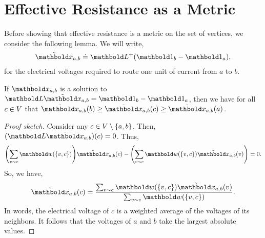 \section{Effective Resistance as a Metric}

Before showing that effective resistance is a metric on the set of vertices, we consider the following lemma. We will write, \begin{align}
    \elx_{a,b} \defeq \pinv{\mL}(\vOne_b - \vOne_a),
\end{align} for the electrical voltages required to route one unit of current from $a$ to $b$.

\begin{lem}\label{lem:voltages_are_weighted_average}
If $\elx_{a,b}$ is a solution to $\mL\elx_{a,b} = \vOne_b - \vOne_a$, then we have for all $c \in V$ that $\elx_{a,b}(b) \geq \elx_{a,b}(c) \geq \elx_{a,b}(a)$.
\end{lem}
\begin{proof}[Proof sketch] Consider any $c \in V \setminus \{a,b\}$. Then, $(\mL\elx_{a,b})(c) = 0$. Thus, \begin{align*}
    \parentheses*{\sum_{v \sim c} \vw(\{v,c\})} \elx_{a,b}(c) - \parentheses*{\sum_{v \sim c} \vw(\{v,c\}) \elx_{a,b}(v)} = 0.
\end{align*} So, we have, \begin{align*}
    \elx_{a,b}(c) = \frac{\sum_{v \sim c} \vw(\{v,c\}) \elx_{a,b}(v)}{\sum_{v \sim c} \vw(\{v,c\})}.
\end{align*} In words, the electrical voltage of $c$ is a weighted average of the voltages of its neighbors. It follows that the voltages of $a$ and $b$ take the largest absolute values.
\end{proof}

